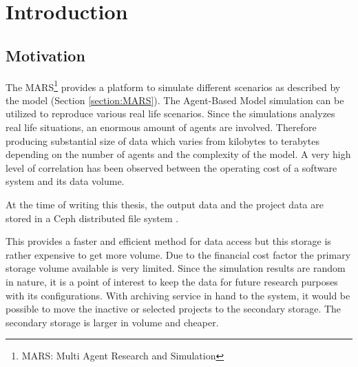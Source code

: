 \newpage
    \chapter{Introduction}
        \section{Motivation}
            
            The MARS\footnote{MARS: Multi Agent Research and Simulation} provides a platform to simulate
            different scenarios as described by the model (Section \ref{section:MARS}). The Agent-Based Model \cite{agentModeling} simulation
            can be utilized to reproduce various real life scenarios. Since the simulations analyzes real life situations, 
            an enormous amount of agents are involved. Therefore producing substantial size of data which varies from kilobytes to terabytes
            depending on the number of agents and the complexity of the model. A very high level of correlation has been observed between 
            the operating cost of a software system and its data volume. 


            \par

            At the time of writing this thesis, the output data and the project data are stored in a
            Ceph distributed file system \cite{Ceph}. 
            
            This provides a faster and efficient method for data
            access but this storage is rather expensive to get more volume. Due to the financial cost 
            factor the primary storage volume available is very limited. Since the simulation 
            results are random in nature, it is a point of interest to keep the data for future
            research purposes with its configurations. With archiving service in hand to the system, 
            it would be possible to move the inactive or selected projects to the secondary storage. 
            The secondary storage is larger in volume and cheaper. 

            \par

